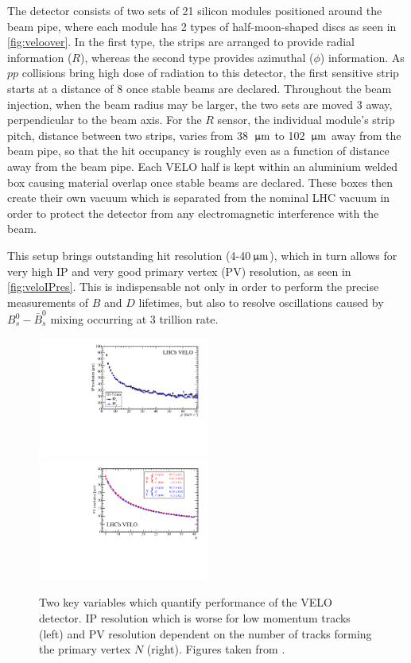 The detector consists of two sets of 21 silicon modules positioned around the beam pipe, where each module has 2 types of half-moon-shaped discs as seen in \autoref{fig:veloover}. In the first type, the strips are arranged to provide radial information ($R$), whereas the second type provides azimuthal ($\phi$) information. As $pp$ collisions bring high dose of radiation to this detector, the first sensitive strip starts at a distance of 8 \mm once stable beams are declared. Throughout the beam injection, when the beam radius may be larger, the two sets are moved 3 \cm away, perpendicular to the beam axis. For the $R$ sensor, the individual module's strip pitch, distance between two strips, varies from 38 ${\,\upmu\rm m}$ to 102 ${\,\upmu\rm m}$ away from the beam pipe, so that the hit occupancy is roughly even as a function of distance away from the beam pipe. Each \Gls{VELO} half is kept within an aluminium welded box causing material overlap once stable beams are declared. These boxes then create their own vacuum which is separated from the nominal \gls{LHC} vacuum in order to protect the detector from any electromagnetic interference with the beam. 

This setup brings outstanding hit resolution (4-40${\,\upmu\rm m}$), which in turn allows for very high \gls{IP} and very good primary vertex (\gls{PV}) resolution, as seen in \autoref{fig:veloIPres}. This is indispensable not only in order to perform the precise measurements of $B$ and $D$ lifetimes, but also to resolve oscillations caused by $B^{0}_{s}-\bar{B}^{0}_{s}$ mixing occurring at 3 trillion \hz rate.

\begin{figure}[!h]
	\centering
	\includegraphics[width = 0.5\textwidth]{figs/detector/IPRes-Vs-P-CompareIPxIPy-2012.pdf}%
        \includegraphics[width = 0.5\textwidth]{figs/detector/ResXY_1PV_2011Data.pdf}
	\caption{Two key variables which quantify performance of the \Gls{VELO} detector. \Gls{IP} resolution which is worse for low momentum tracks (left) and \Gls{PV} resolution dependent on the number of tracks forming the primary vertex $N$ (right). Figures taken from \cite{LHCbVELOGroup:2014uea}.}
	\label{fig:veloIPres}
\end{figure}


